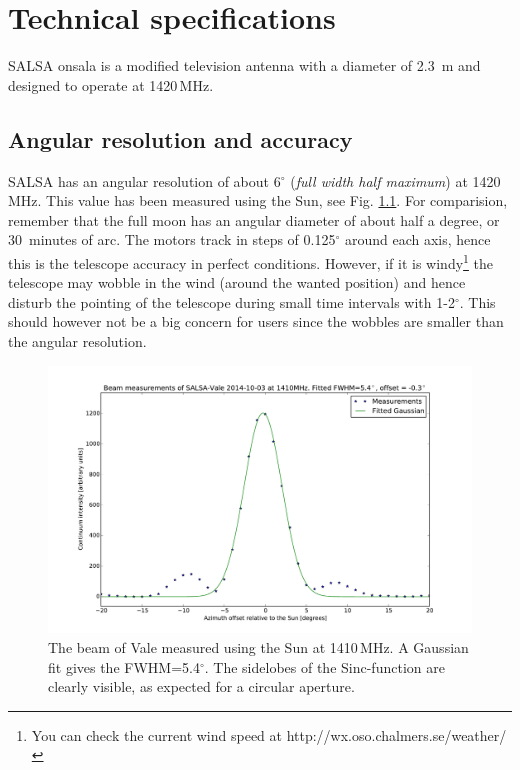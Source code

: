 \chapter{Technical specifications}
\label{chap:tech}
SALSA onsala is a modified television antenna with a diameter of 2.3~m and designed
to operate at 1420\,MHz.

\section{Angular resolution and accuracy}
\label{sect:ares}
SALSA has an angular resolution of about 6$^\circ$ (\emph{full width half
maximum}) at 1420\,MHz. This value has been measured using the Sun, see Fig.
\ref{fig:beam}. For comparision, remember that the full moon has an angular
diameter of about half a degree, or 30~minutes of arc. The motors track 
in steps of 0.125$^\circ$ around each axis, hence this is the telescope
accuracy in perfect conditions. However, if it is windy\footnote{You can check
the current wind speed at http://wx.oso.chalmers.se/weather/} the telescope
may wobble in the wind (around the wanted position) and hence disturb
the pointing of the telescope during small time intervals with 1-2$^\circ$. 
This should however not be a big concern for users since the wobbles are smaller
than the angular resolution.
\begin{figure}[ht]
\begin{center}
\includegraphics[width=\textwidth]{../figures/Beam_vale_2014-10-03.pdf}
\end{center}
\caption{The beam of Vale measured using the Sun at 1410\,MHz. A Gaussian fit
gives the FWHM=5.4$^\circ$. The sidelobes of the Sinc-function are clearly
visible, as expected for a circular aperture.}
\label{fig:beam}
\end{figure}

